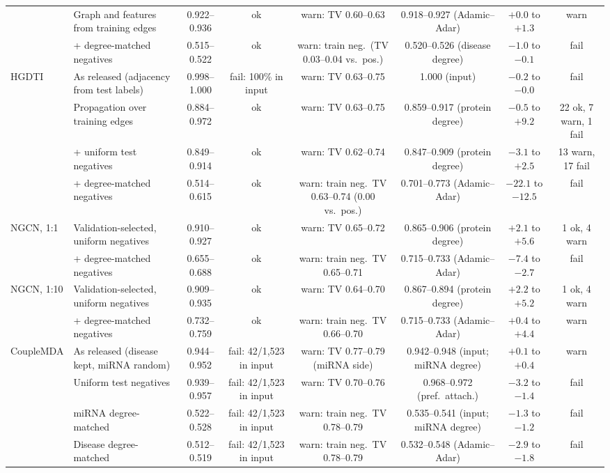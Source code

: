 \begin{table}[h!]
{\begin{tabular}{llcccccc}
 & Graph and features from training edges & 0.922--0.936 & ok & warn: TV 0.60--0.63 & 0.918--0.927 (Adamic--Adar) & $+0.0$ to $+1.3$ & warn \\
 & + degree-matched negatives & 0.515--0.522 & ok & warn: train neg.\ (TV 0.03--0.04 vs.\ pos.) & 0.520--0.526 (disease degree) & $-1.0$ to $-0.1$ & fail \\
\hline
HGDTI & As released (adjacency from test labels) & 0.998--1.000 & fail: 100\% in input & warn: TV 0.63--0.75 & 1.000 (input) & $-0.2$ to $-0.0$ & fail \\
 & Propagation over training edges & 0.884--0.972 & ok & warn: TV 0.63--0.75 & 0.859--0.917 (protein degree) & $-0.5$ to $+9.2$ & 22 ok, 7 warn, 1 fail \\
 & + uniform test negatives & 0.849--0.914 & ok & warn: TV 0.62--0.74 & 0.847--0.909 (protein degree) & $-3.1$ to $+2.5$ & 13 warn, 17 fail \\
 & + degree-matched negatives & 0.514--0.615 & ok & warn: train neg.\ TV 0.63--0.74 (0.00 vs.\ pos.) & 0.701--0.773 (Adamic--Adar) & $-22.1$ to $-12.5$ & fail \\
\hline
NGCN, 1:1 & Validation-selected, uniform negatives & 0.910--0.927 & ok & warn: TV 0.65--0.72 & 0.865--0.906 (protein degree) & $+2.1$ to $+5.6$ & 1 ok, 4 warn \\
 & + degree-matched negatives & 0.655--0.688 & ok & warn: train neg.\ TV 0.65--0.71 & 0.715--0.733 (Adamic--Adar) & $-7.4$ to $-2.7$ & fail \\
NGCN, 1:10 & Validation-selected, uniform negatives & 0.909--0.935 & ok & warn: TV 0.64--0.70 & 0.867--0.894 (protein degree) & $+2.2$ to $+5.2$ & 1 ok, 4 warn \\
 & + degree-matched negatives & 0.732--0.759 & ok & warn: train neg.\ TV 0.66--0.70 & 0.715--0.733 (Adamic--Adar) & $+0.4$ to $+4.4$ & warn \\
\hline
CoupleMDA & As released (disease kept, miRNA random) & 0.944--0.952 & fail: 42/1,523 in input & warn: TV 0.77--0.79 (miRNA side) & 0.942--0.948 (input; miRNA degree) & $+0.1$ to $+0.4$ & warn \\
 & Uniform test negatives & 0.939--0.957 & fail: 42/1,523 in input & warn: TV 0.70--0.76 & 0.968--0.972 (pref.\ attach.) & $-3.2$ to $-1.4$ & fail \\
 & miRNA degree-matched & 0.522--0.528 & fail: 42/1,523 in input & warn: train neg.\ TV 0.78--0.79 & 0.535--0.541 (input; miRNA degree) & $-1.3$ to $-1.2$ & fail \\
 & Disease degree-matched & 0.512--0.519 & fail: 42/1,523 in input & warn: train neg.\ TV 0.78--0.79 & 0.532--0.548 (Adamic--Adar) & $-2.9$ to $-1.8$ & fail \\

\end{tabular}}
\end{table}
